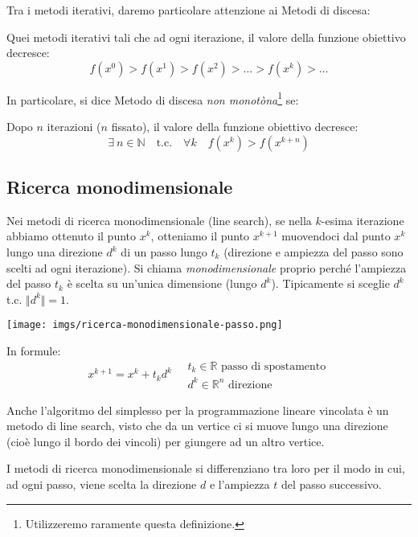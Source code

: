 Tra i metodi iterativi, daremo particolare attenzione ai Metodi di
discesa:
\begin{defn} Quei metodi iterativi tali che ad ogni
iterazione, il valore della funzione obiettivo decresce: $$ f(x^0) >
f(x^1) > f(x^2) > \ldots > f(x^k) > \ldots $$
\end{defn}

In particolare, si dice Metodo di discesa \emph{non
monotòna}\footnote{Utilizzeremo raramente questa definizione.} se:
\begin{defn} Dopo $n$ iterazioni ($n$
fissato), il valore della funzione obiettivo decresce:
$$ \exists ~ n \in \mathbb{N} \quad \text{t.c.} \quad \forall k \quad f(x^k) > f(x^{k+n}) $$
\end{defn}

\subsection{Ricerca monodimensionale} Nei metodi di ricerca
monodimensionale (line search), se nella $k$-esima iterazione abbiamo
ottenuto il punto $x^k$, otteniamo il punto $x^{k+1}$ muovendoci dal
punto $x^k$ lungo una direzione $d^k$ di un passo lungo $t_k$
(direzione e ampiezza del passo sono scelti ad ogni iterazione). Si
chiama \emph{monodimensionale} proprio perch\'e l'ampiezza del passo
$t_k$ \`e scelta su un'unica dimensione (lungo $d^k$). Tipicamente si
sceglie $d^k$ t.c. $\Vert d^k \Vert = 1$.

\centerline{\texttt{[image: imgs/ricerca-monodimensionale-passo.png]}}

In formule:
$$ x^{k+1} = x^{k} + t_k d^{k} \quad
  \begin{array}{l} t_k \in \mathbb{R}\text{ passo di spostamento} \\
d^{k} \in \mathbb{R}^n \text{ direzione}
  \end{array}
$$

\begin{notes} Anche l'algoritmo del simplesso per la programmazione
lineare vincolata \`e un metodo di line search, visto che da un vertice
ci si muove lungo una direzione (cio\`e lungo il bordo dei vincoli) per
giungere ad un altro vertice.
\end{notes}

I metodi di ricerca monodimensionale si differenziano tra loro
per il modo in cui, ad ogni passo, viene scelta la
direzione $d$ e l'ampiezza $t$ del passo successivo.

